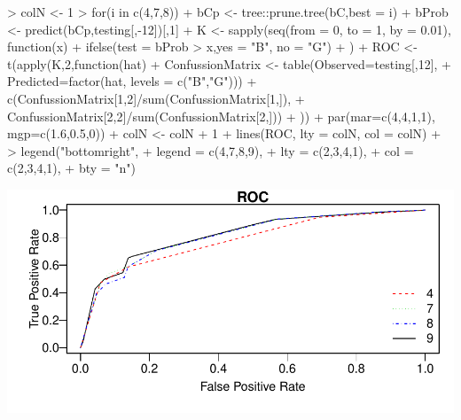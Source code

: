 \documentclass[12pt,a4paper]{paper}
\begin{document}
\begin{enumerate}
\begin{enumerate}
\begin{enumerate}
\begin{Schunk}
\begin{Sinput}
> colN <- 1
> for(i in c(4,7,8)){
+   bCp <- tree::prune.tree(bC,best = i)
+ bProb <- predict(bCp,testing[,-12])[,1]
+ K <- sapply(seq(from = 0, to = 1, by = 0.01), function(x){
+   ifelse(test = bProb > x,yes = "B", no = "G")
+ })
+ ROC <- t(apply(K,2,function(hat){
+   ConfussionMatrix <- table(Observed=testing[,12],
+                             Predicted=factor(hat, levels = c("B","G")))
+   c(ConfussionMatrix[1,2]/sum(ConfussionMatrix[1,]),
+     ConfussionMatrix[2,2]/sum(ConfussionMatrix[2,]))
+ }))
+ par(mar=c(4,4,1,1), mgp=c(1.6,0.5,0))
+ colN <- colN + 1
+ lines(ROC, lty = colN, col = colN)
+ }
> legend("bottomright", 
+        legend = c(4,7,8,9), 
+        lty = c(2,3,4,1), 
+        col = c(2,3,4,1), 
+        bty = "n")
\end{Sinput}
\end{Schunk}
\includegraphics{HW6_DanielOsorio-020}
\end{enumerate}
\end{enumerate}
\end{enumerate}
\end{document}
